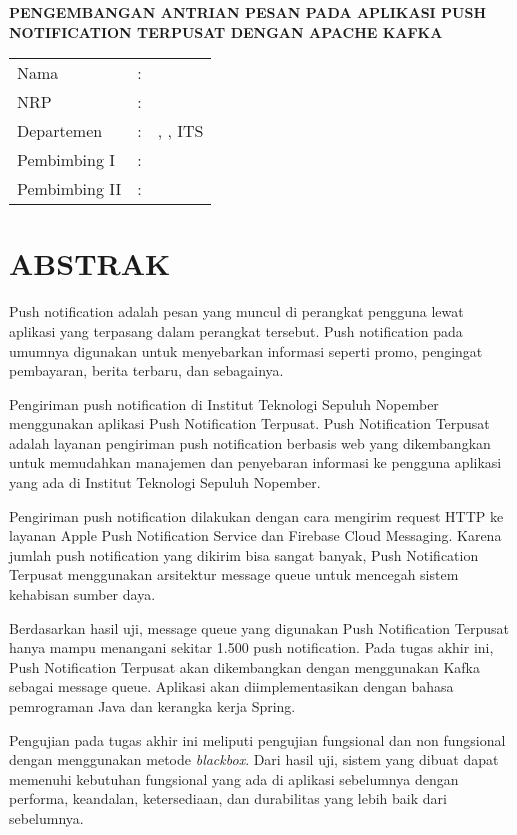 \begin{center}
	\centering\noindent\textbf{\MakeUppercase{Pengembangan Antrian Pesan pada Aplikasi Push Notification Terpusat dengan Apache Kafka}}
\end{center}
\vspace*{1em}

\noindent\begin{tabularx}{\linewidth}{l l X}
	Nama & : & \penulis \\
	NRP & :	& \nrp \\
	Departemen & : & \jurusan, \newline \fakultas, ITS \\
	Pembimbing I & : & \pembimbingsatu \\
	Pembimbing II & : & \pembimbingdua
\end {tabularx}

{\let\clearpage\relax\titlespacing{\chapter}{0em}{0em}{1em} \chapter{ABSTRAK}}
\itshape
\par Push notification adalah pesan yang muncul di perangkat pengguna lewat aplikasi yang terpasang dalam perangkat tersebut. Push notification pada umumnya digunakan untuk menyebarkan informasi seperti promo, pengingat pembayaran, berita terbaru, dan sebagainya.
\par Pengiriman push notification di Institut Teknologi Sepuluh Nopember menggunakan aplikasi Push Notification Terpusat. Push Notification Terpusat adalah layanan pengiriman push notification berbasis web yang dikembangkan untuk memudahkan manajemen dan penyebaran informasi ke pengguna aplikasi yang ada di Institut Teknologi Sepuluh Nopember.
\par Pengiriman push notification dilakukan dengan cara mengirim request HTTP ke layanan Apple Push Notification Service dan Firebase Cloud Messaging. Karena jumlah push notification yang dikirim bisa sangat banyak, Push Notification Terpusat menggunakan arsitektur message queue untuk mencegah sistem kehabisan sumber daya.
\par Berdasarkan hasil uji, message queue yang digunakan Push Notification Terpusat hanya mampu menangani sekitar 1.500 push notification. Pada tugas akhir ini, Push Notification Terpusat akan dikembangkan dengan menggunakan Kafka sebagai message queue. Aplikasi akan diimplementasikan dengan bahasa pemrograman Java dan kerangka kerja Spring.
\par Pengujian pada tugas akhir ini meliputi pengujian fungsional dan non fungsional dengan menggunakan metode \textit{blackbox}. Dari hasil uji, sistem yang dibuat dapat memenuhi kebutuhan fungsional yang ada di aplikasi sebelumnya dengan performa, keandalan, ketersediaan, dan durabilitas yang lebih baik dari sebelumnya.

